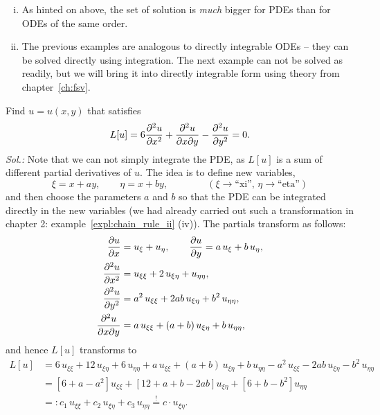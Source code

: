 \begin{remark}
\begin{enumerate}[(i)]
	\item As hinted on above, the set of solution is \emph{much} bigger for PDEs than for ODEs of the same order.
	\item The previous examples are analogous to directly integrable ODEs -- they can be solved directly using integration. The next example can not be solved as readily, but we will bring it into directly integrable form using theory from chapter~\ref{ch:fsv}.
\end{enumerate}
\end{remark}

\begin{example}
Find $u=u(x,y)$ that satisfies
\[ L[u] = 6\displaystyle{\frac{\partial^2 u}{\partial x^2}} + \displaystyle{\frac{\partial^2 u}{\partial{x}\partial{y}}} - \displaystyle{\frac{\partial^2 u}{\partial y^2}} = 0. \]
	{\it Sol.:}
Note that we can not simply integrate the PDE, as $L[u]$ is a sum of different partial derivatives of $u$. The idea is to define new variables,
\[ \xi = x+ay,\qquad \eta=x+by, \qquad \qquad
(\xi\rightarrow\text{``xi''},\,\eta\rightarrow\text{``eta''})\]
and then choose the parameters $a$ and $b$ so that the PDE can be integrated directly in the new variables (we had already carried out such a transformation in chapter 2: example~\ref{expl:chain_rule_ii} (iv)). The partials transform as follows:
\begin{equation*}
\begin{split}
\displaystyle{\frac{\partial u}{\partial x}} &= u_\xi+u_\eta, \qquad
\displaystyle{\frac{\partial u}{\partial y}} = a\,u_\xi+b\,u_\eta, \\
\displaystyle{\frac{\partial^2 u}{\partial x^2}} &= u_{\xi\xi}+2\,u_{\xi\eta}+u_{\eta\eta}, \\
\displaystyle{\frac{\partial^2 u}{\partial y^2}} &= a^2\,u_{\xi\xi}+2ab\,u_{\xi\eta}+b^2\,u_{\eta\eta}, \\
\displaystyle{\frac{\partial^2 u}{\partial{x}\partial{y}}} &= a\,u_{\xi\xi}+(a+b)\,u_{\xi\eta}+b\,u_{\eta\eta}, 
\end{split}
\end{equation*}
and hence $L[u]$ transforms to 
\begin{equation*}
\begin{split}
L[u] &= 6\,u_{\xi\xi}+12\,u_{\xi\eta}+6\,u_{\eta\eta}
+ a\,u_{\xi\xi}+(a+b)\,u_{\xi\eta}+b\,u_{\eta\eta}
- a^2\,u_{\xi\xi}-2ab\,u_{\xi\eta}-b^2\,u_{\eta\eta} \\
&= \left[ 6+a-a^2 \right]u_{\xi\xi} + \left[ 12+a+b-2ab \right]u_{\xi\eta}
+\left[ 6+b-b^2 \right]u_{\eta\eta} \\
&=: c_1\,u_{\xi\xi} + c_2\,u_{\xi\eta} + c_3\,u_{\eta\eta}
\stackrel{!}{=} c \cdot u_{\xi\eta}.
\end{split}

\end{equation*}
\end{example}
